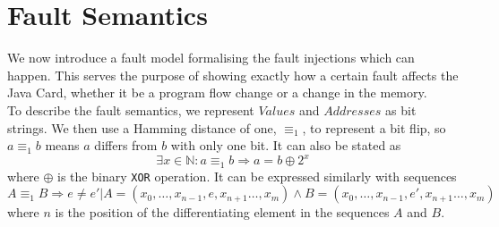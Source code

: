 \section{Fault Semantics}
\label{sec:semFault}
We now introduce a fault model  formalising the fault injections which can happen. This serves the purpose of showing exactly how a certain fault affects the Java Card, whether it be a program flow change or a change in the memory.\\

To describe the fault semantics, we represent $Values$ and $Addresses$ as bit strings. 
We then use a Hamming distance of one, $\equiv_1$, to represent a bit flip, so $a \equiv_1 b$ means $a$ differs from $b$ with only one bit. 
It can also be stated as 
$$\exists x \in \mathbb{N}: a \equiv_1 b \Rightarrow a = b \oplus 2^x$$
where $\oplus$ is the binary \texttt{XOR} operation. 
It can be expressed similarly with sequences $$A \equiv_1 B \Rightarrow e \neq e' | A = (x_0, \ldots, x_{n-1}, e, x_{n+1} \ldots,
 x_m) \land B = (x_0, \ldots,x_{n-1}, e', x_{n+1} \ldots, x_m)$$ where $n$ is the position of the differentiating element in the sequences $A$ and $B$.



